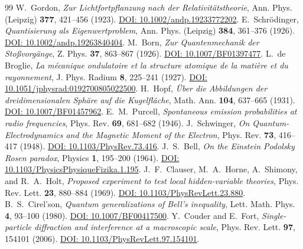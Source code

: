 \documentclass[11pt,a4paper]{article}
\theoremstyle{definition}
\theoremstyle{remark}
\begin{document}
\begin{thebibliography}{99}
	 W.~Gordon, \textit{Zur Lichtfortpflanzung nach der Relativit{\"a}tstheorie}, Ann. Phys. (Leipzig) \textbf{377}, 421--456 (1923). \href{https://doi.org/10.1002/andp.19233772202}{DOI: 10.1002/andp.19233772202}.
	 E.~Schr{\"o}dinger, \textit{Quantisierung als Eigenwertproblem}, Ann. Phys. (Leipzig) \textbf{384}, 361--376 (1926). \href{https://doi.org/10.1002/andp.19263840404}{DOI: 10.1002/andp.19263840404}.
	 M.~Born, \textit{Zur Quantenmechanik der Sto{\ss}vorg{\"a}nge}, Z. Phys. \textbf{37}, 863--867 (1926). \href{https://doi.org/10.1007/BF01397477}{DOI: 10.1007/BF01397477}.
	 L.~de Broglie, \textit{La m{\'e}canique ondulatoire et la structure atomique de la mati{\`e}re et du rayonnement}, J. Phys. Radium \textbf{8}, 225--241 (1927). \href{https://doi.org/10.1051/jphysrad:0192700805022500}{DOI: 10.1051/jphysrad:0192700805022500}.
	 H.~Hopf, \textit{{\"U}ber die Abbildungen der dreidimensionalen Sph{\"a}re auf die Kugelfl{\"a}che}, Math. Ann. \textbf{104}, 637--665 (1931). \href{https://doi.org/10.1007/BF01457962}{DOI: 10.1007/BF01457962}.
	 E.~M.~Purcell, \textit{Spontaneous emission probabilities at radio frequencies}, Phys. Rev. \textbf{69}, 681--682 (1946).
	 J.~Schwinger, \textit{On Quantum-Electrodynamics and the Magnetic Moment of the Electron}, Phys. Rev. \textbf{73}, 416--417 (1948). \href{https://doi.org/10.1103/PhysRev.73.416}{DOI: 10.1103/PhysRev.73.416}.
	 J.~S.~Bell, \textit{On the Einstein Podolsky Rosen paradox}, Physics \textbf{1}, 195--200 (1964). \href{https://doi.org/10.1103/PhysicsPhysiqueFizika.1.195}{DOI: 10.1103/PhysicsPhysiqueFizika.1.195}.
	 J.~F.~Clauser, M.~A.~Horne, A.~Shimony, and R.~A.~Holt, \textit{Proposed experiment to test local hidden-variable theories}, Phys. Rev. Lett. \textbf{23}, 880--884 (1969). \href{https://doi.org/10.1103/PhysRevLett.23.880}{DOI: 10.1103/PhysRevLett.23.880}.
	 B.~S.~Cirel'son, \textit{Quantum generalizations of Bell's inequality}, Lett. Math. Phys. \textbf{4}, 93--100 (1980). \href{https://doi.org/10.1007/BF00417500}{DOI: 10.1007/BF00417500}.
	 Y.~Couder and E.~Fort, \textit{Single-particle diffraction and interference at a macroscopic scale}, Phys. Rev. Lett. \textbf{97}, 154101 (2006). \href{https://doi.org/10.1103/PhysRevLett.97.154101}{DOI: 10.1103/PhysRevLett.97.154101}.
	

\end{thebibliography}
\end{document}
